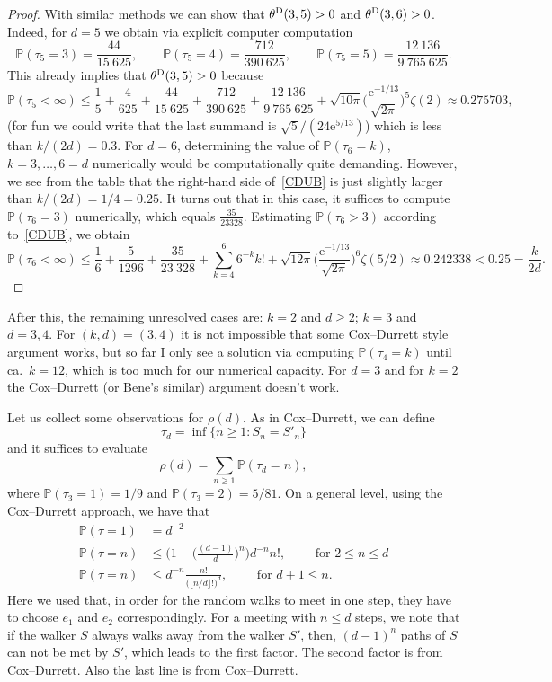 \documentclass{article}
\newcommand{\e}{\mathrm e}
\theoremstyle{definition}
\renewcommand{\P}{\mathbb{P}}
\newcommand{\1}{\mathbbm{1}}
\newcommand{\0}{\mathbf{o}}
\begin{document}
\begin{proof}
With similar methods we can show that $\theta^{\rm D}(3,5)>0$ and $\theta^{\rm D}(3,6)>0$. Indeed, for $d=5$ we obtain via explicit computer computation
\[ \P(\tau_5=3)=\frac{44}{15\ 625}, \qquad \P(\tau_5=4)=\frac{712}{390\  625}, \qquad \P(\tau_5=5)=\frac{12\ 136}{9\ 765\ 625}. \]
This already implies that  $\theta^{\rm D}(3,5)>0$ because
\[ \P(\tau_5<\infty) \leq \frac{1}{5} + \frac{4}{625} + \frac{44}{15\ 625} + \frac{712}{390\  625} + \frac{12\ 136}{9\ 765\ 625} + \sqrt{10\pi} \Big( \frac{\e^{-1/13}}{\sqrt{2\pi}} \Big)^5 \zeta(2) \approx 0.275703, \]
\color{red} (for fun we could write that the last summand is $\sqrt 5/(24 \e^{5/13})$) \color{black} which is less than $k/(2d)=0.3$. For $d=6$, determining the value of $\P(\tau_6=k)$, $k=3,\ldots,6=d$ numerically would be computationally quite demanding. However, we see from the table that the right-hand side of~\eqref{CDUB} is just slightly larger than $k/(2d)=1/4=0.25$. It turns out that in this case, it suffices to compute $\P(\tau_6=3)$ numerically, which equals $\frac{35}{23328}$. Estimating $\P(\tau_6>3)$ according to~\eqref{CDUB}, we obtain
\[ \P(\tau_6<\infty) \leq \frac{1}{6} + \frac{5}{1296} + \frac{35}{23\ 328} + \sum_{k=4}^6 6^{-k} k! + \sqrt{12\pi} \Big( \frac{\e^{-1/13}}{\sqrt{2\pi}} \Big)^6 \zeta(5/2) \approx 0.242338 < 0.25=\frac{k}{2d}. \]
\end{proof}

\color{green} After this, the remaining unresolved cases are: $k=2$ and $d \geq 2$; $k=3$ and $d=3,4$. For $(k,d)=(3,4)$ it is not impossible that some Cox--Durrett style argument works, but so far I only see a solution via computing $\P(\tau_4=k)$ until ca.\ $k=12$, which is too much for our numerical capacity. For $d=3$ and for $k=2$ the Cox--Durrett (or Bene's similar) argument doesn't work. \color{black}


Let us collect some observations for $\rho(d)$. As in Cox--Durrett, we can define 
$$
\tau_d=\inf\{n\ge 1\colon S_n=S'_n\}
$$
and it suffices to evaluate
$$
\rho(d)=\sum_{n\ge 1}\P(\tau_d=n),
$$
where $\P(\tau_3=1)=1/9$ and $\P(\tau_3=2)=5/81$. On a general level, using the Cox--Durrett approach, we have that 
\begin{align*}
\P(\tau=1)&=d^{-2}\\
\P(\tau=n)&\le \Big(1-\Big(\frac{(d-1)}{d}\Big)^n\Big)d^{-n}n!,\qquad\text{ for } 2\le n\le d \\
\P(\tau=n)&\le d^{-n}\frac{n!}{\big(\lfloor n/d\rfloor!\big)^d},\qquad\text{ for } d+1\le n.
\end{align*}
Here we used that, in order for the random walks to meet in one step, they have to choose $e_1$ and $e_2$ correspondingly. For a meeting with $n\le d$ steps, we note that if the walker $S$ always walks away from the walker $S'$, then, $(d-1)^n$ paths of $S$ can not be met by $S'$, which leads to the first factor. The second factor is from Cox--Durrett. Also the last line is from Cox--Durrett. 
\end{document}
